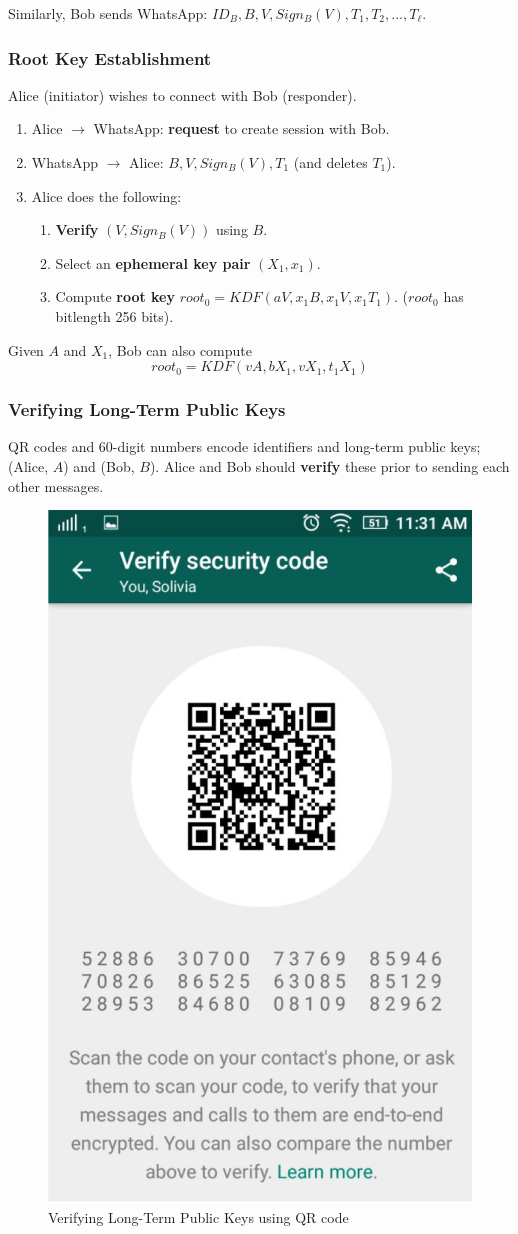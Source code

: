 \documentclass[12pt,titlepage]{article}
\begin{document}
Similarly, Bob sends WhatsApp: $ID_B, B, V, Sign_B (V), T_1, T_2 , ..., T_\ell$.
\subsubsection{Root Key Establishment}
Alice (initiator) wishes to connect with Bob (responder).\begin{enumerate}
	\item Alice $\rightarrow$ WhatsApp: \textbf{request} to create session with Bob.
	\item WhatsApp $\rightarrow$ Alice: $B, V, Sign_B(V), T_1$ (and deletes $T_1$).
	\item Alice does the following:\begin{enumerate}
		\item \textbf{Verify} $(V, Sign_B (V))$ using $B$.
		\item Select an \textbf{ephemeral key pair} $(X_1, x_1)$.
		\item Compute \textbf{root key} $root_0 = KDF(aV, x_1B, x_1V, x_1T_1 )$. ($root_0$ has bitlength 256 bits).
	\end{enumerate}
\end{enumerate}
Given $A$ and $X_1$, Bob can also compute $$root_0 = KDF(vA, bX_1 , vX_1, t_1X_1)$$
\subsubsection{Verifying Long-Term Public Keys}
QR codes and 60-digit numbers encode identifiers and long-term public keys; (Alice, $A$) and (Bob, $B$). Alice and Bob should \textbf{verify} these prior to sending each other messages.

\begin{center}
	\begin{figure}[h!]
		\centering
		\includegraphics[width=.5\textwidth]{Signal_Protocol_verify_QR.png}
		\caption{Verifying Long-Term Public Keys using QR code}
	\end{figure}
\end{center}
\newpage
\end{document}
